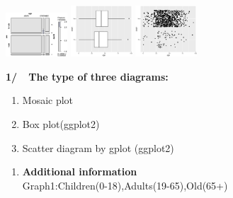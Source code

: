 \documentclass[landscape,final,a0paper]{baposter}
\begin{document}
\begin{poster}
{\begin{minipage}[c]{8cm}
\includegraphics[width=2.3cm]{e3.eps}
  \includegraphics[width=2.3cm]{e4.eps}
    \includegraphics[width=2.3cm]{e5.eps}
\item {\bf1/\ \ The type of three diagrams:}
	\begin{enumerate}
\item Mosaic plot
\item Box plot(ggplot2)
\item Scatter diagram by gplot (ggplot2)
	\end{enumerate}
\end{minipage}
\begin{minipage}[c]{8.35cm}
\begin{enumerate}
{\bf 2/\ \ Analysis}
\\The {\bf first} graph shows that the mortality rate is slightly lower in female adults .\\ The old have higher mortality rates than adults, with children being the highest, but its residuals are too large to be accepted.
\\The {\bf second} and the {\bf third} graphs show that most of the sufferers and the dead are adults, but the mortality rate among adults is the lowest .(Guess:There are fewer children and the elderly)
\\\item {\bf Additional information}
\\Graph1:Children(0-18),Adults(19-65),Old(65+)
\end{enumerate}
\end{minipage}
	
  \vspace{0.5em}
  }


\end{poster}
\end{document}
